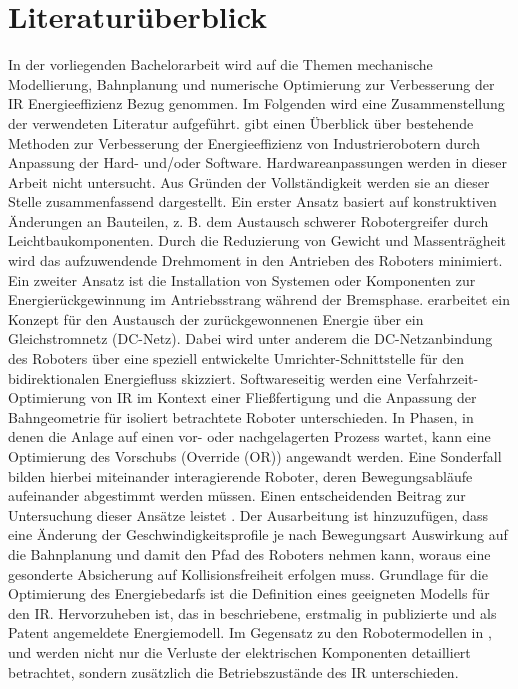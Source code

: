\section{Literaturüberblick}
In der vorliegenden Bachelorarbeit wird auf die Themen mechanische Modellierung, Bahnplanung und numerische Optimierung zur Verbesserung der IR Energieeffizienz Bezug genommen. Im Folgenden wird eine Zusammenstellung der verwendeten Literatur aufgeführt. \cite{Carabin.2017} gibt einen Überblick über bestehende Methoden zur Verbesserung der Energieeffizienz von Industrierobotern durch Anpassung der Hard- und/oder Software. Hardwareanpassungen werden in dieser Arbeit nicht untersucht. Aus Gründen der Vollständigkeit werden sie an dieser Stelle zusammenfassend dargestellt. Ein erster Ansatz basiert auf konstruktiven Änderungen an Bauteilen, z. B. dem Austausch schwerer Robotergreifer durch Leichtbaukomponenten. Durch die Reduzierung von Gewicht und Massenträgheit wird das aufzuwendende Drehmoment in den Antrieben des Roboters minimiert. Ein zweiter Ansatz ist die Installation von Systemen oder Komponenten zur Energierückgewinnung im Antriebsstrang während der Bremsphase. \cite{Pellicciari.2015} erarbeitet ein Konzept für den Austausch der zurückgewonnenen Energie über ein Gleichstromnetz (DC-Netz). Dabei wird unter anderem die DC-Netzanbindung des Roboters über eine speziell entwickelte Umrichter-Schnittstelle für den bidirektionalen Energiefluss skizziert. Softwareseitig werden eine Verfahrzeit-Optimierung von IR im Kontext einer Fließfertigung und die Anpassung der Bahngeometrie für isoliert betrachtete Roboter unterschieden.  In Phasen, in denen die Anlage auf einen vor- oder nachgelagerten Prozess wartet, kann eine Optimierung des Vorschubs (Override (OR)) angewandt werden. Eine Sonderfall bilden hierbei miteinander interagierende Roboter, deren Bewegungsabläufe aufeinander abgestimmt werden müssen. Einen entscheidenden Beitrag zur Untersuchung dieser Ansätze  leistet \cite{Eggers.2019}. Der Ausarbeitung ist hinzuzufügen, dass eine Änderung der Geschwindigkeitsprofile je nach Bewegungsart Auswirkung auf die Bahnplanung und damit den Pfad des Roboters nehmen kann, woraus eine gesonderte Absicherung auf Kollisionsfreiheit erfolgen muss. 
%
%
Grundlage für die Optimierung des Energiebedarfs ist die Definition eines geeigneten Modells für den IR. 
Hervorzuheben ist, das in \cite{Eggers.2019} beschriebene, erstmalig in \cite{Ziaukas.2017} publizierte und als Patent  \cite{Patent.2016} angemeldete Energiemodell. Im Gegensatz zu den Robotermodellen in \cite{Pellicciari.2011}, \cite{Sergaki.2002} und \cite{Paryanto.2015} werden nicht nur die Verluste der elektrischen Komponenten detailliert betrachtet, sondern zusätzlich die Betriebszustände des IR unterschieden. 
